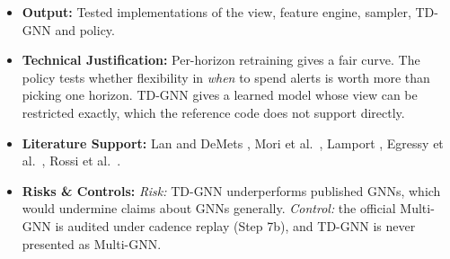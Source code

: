 \documentclass[11pt,a4paper]{article}
\begin{document}
\begin{itemize}[leftmargin=*]
    \item \textbf{Output:} Tested implementations of the view, feature engine, sampler, TD-GNN and policy.
    \item \textbf{Technical Justification:} Per-horizon retraining gives a fair curve. The policy tests whether flexibility in \emph{when} to spend alerts is worth more than picking one horizon. TD-GNN gives a learned model whose view can be restricted exactly, which the reference code does not support directly.
    \item \textbf{Literature Support:} Lan and DeMets \cite{lan1983alpha}, Mori et al.\ \cite{mori2018early}, Lamport \cite{lamport1978clocks}, Egressy et al.\ \cite{egressy2024multigraph}, Rossi et al.\ \cite{rossi2020tgn}.
    \item \textbf{Risks \& Controls:} \textit{Risk:} TD-GNN underperforms published GNNs, which would undermine claims about GNNs generally. \textit{Control:} the official Multi-GNN is audited under cadence replay (Step 7b), and TD-GNN is never presented as Multi-GNN.
\end{itemize}

\end{document}
